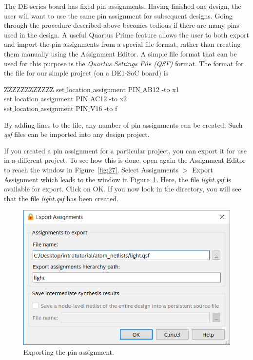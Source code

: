 \documentclass[11pt, twoside, pdftex]{article}
\begin{document}
The DE-series board has fixed pin assignments. Having finished one design, the user will want
to use the same pin assignment for subsequent designs. Going through the procedure 
described above becomes tedious if there are many pins used in the design.
A useful Quartus Prime feature allows the user to both
export and import the pin assignments from a special file format, 
rather than creating them manually
using the Assignment Editor. A simple file format that can be used for this purpose
is the {\it Quartus Settings File (QSF)} format. The format for the file for our simple project (on a DE1-SoC board) is

\begin{center} %
\parbox{12.5cm}{
\begin{tabbing}
ZZ\=ZZ\=ZZ\=ZZ\=ZZ\=ZZ\kill
set$\_$location$\_$assignment PIN$\_$AB12 -to x1 \\
set$\_$location$\_$assignment PIN$\_$AC12 -to x2 \\
set$\_$location$\_$assignment PIN$\_$V16 -to f \\

\end{tabbing} } %
\end{center}

\noindent
By adding lines to the file, any number of pin assignments can be created.
Such {\it qsf} files can be imported into any design project.

If you created a pin assignment for a particular project, you can export it
for use in a different project. To see how this is done, open again the Assignment Editor
to reach the window in Figure~\ref{fig:27}. Select {\sf Assignments $>$ Export Assignment} which leads to the
window in Figure~\ref{fig:28}. Here, the file {\it light.qsf} is available for export.
Click on {\sf OK}.
If you now look in the directory, you will see that
the file {\it light.qsf} has been created.

\begin{figure}[H]
   \begin{center}
      \includegraphics[scale=0.6]{figures/figure28.png}
   \caption{Exporting the pin assignment.} 
	 \label{fig:28}
	 \end{center}
\end{figure}
\end{document}

